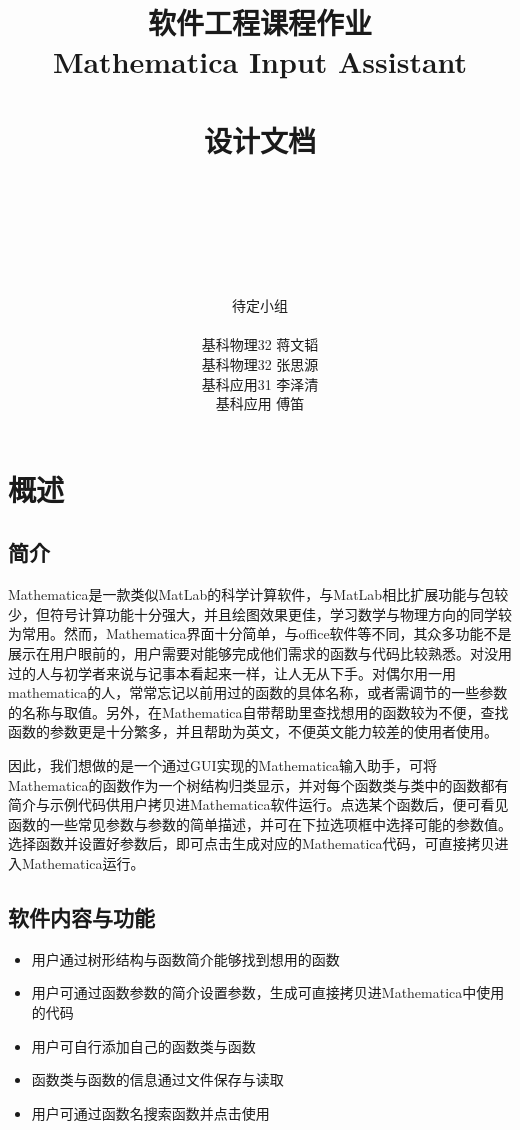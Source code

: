 \documentclass[hyperref, UTF8
,bookmarksnumbered=true, oneside]{ctexbook}
\title{\huge{软件工程课程作业}\\ \Huge \textbf{Mathematica Input Assistant} \\\phantom{aaa} \\\Huge{设计文档}}
\author{\\ \phantom{aaa} \\\phantom{aaa} \\ \phantom{aaa}\\\\\\\huge{待定小组}\\\\ \Large{基科物理32{  }蒋文韬}\\ \Large{基科物理32{ }张思源{ }}\\ \Large{基科应用31{ }李泽清{ }} \\ \Large{基科应用 { }傅笛{ }} }
\begin{document}
\Large

\frontmatter
\maketitle

\tableofcontents

\mainmatter

\chapter{概述}

	\section{简介} %

		Mathematica是一款类似MatLab的科学计算软件，与MatLab相比扩展功能与包较少，但符号计算功能十分强大，并且绘图效果更佳，学习数学与物理方向的同学较为常用。然而，Mathematica界面十分简单，与office软件等不同，其众多功能不是展示在用户眼前的，用户需要对能够完成他们需求的函数与代码比较熟悉。对没用过的人与初学者来说与记事本看起来一样，让人无从下手。对偶尔用一用mathematica的人，常常忘记以前用过的函数的具体名称，或者需调节的一些参数的名称与取值。另外，在Mathematica自带帮助里查找想用的函数较为不便，查找函数的参数更是十分繁多，并且帮助为英文，不便英文能力较差的使用者使用。

		因此，我们想做的是一个通过GUI实现的Mathematica输入助手，可将Mathematica的函数作为一个树结构归类显示，并对每个函数类与类中的函数都有简介与示例代码供用户拷贝进Mathematica软件运行。点选某个函数后，便可看见函数的一些常见参数与参数的简单描述，并可在下拉选项框中选择可能的参数值。选择函数并设置好参数后，即可点击生成对应的Mathematica代码，可直接拷贝进入Mathematica运行。
		

	\section{软件内容与功能} %

		\begin{itemize}
			\item 用户通过树形结构与函数简介能够找到想用的函数
			\item 用户可通过函数参数的简介设置参数，生成可直接拷贝进Mathematica中使用的代码
			\item 用户可自行添加自己的函数类与函数
			\item 函数类与函数的信息通过文件保存与读取
			\item 用户可通过函数名搜索函数并点击使用 
		\end{itemize}
		
\end{document}
